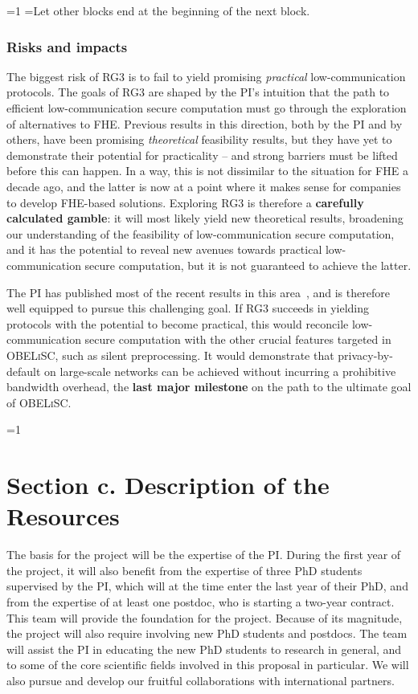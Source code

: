 \documentclass[oneside, a4paper, onecolumn, 11pt]{article}
\newcommand{\OBELiSC}{\textsc{OBELiSC}\xspace}
\newcounter{alphasect}
\def\alphainsection{0}
\let\oldsection=\section
\def\section{%
  \ifnum\alphainsection=1%
    \addtocounter{alphasect}{1}
  \fi%
\oldsection}%
\newenvironment{alphasection}{%
  \ifnum\alphainsection=1%
    \errhelp={Let other blocks end at the beginning of the next block.}
    \errmessage{Nested Alpha section not allowed}
  \fi%
  \setcounter{alphasect}{0}
  \def\alphainsection{1}
}{%
  \setcounter{alphasect}{0}
  \def\alphainsection{0}
}%
\begin{document}
\begin{alphasection}
\subsubsection{Risks and impacts}

The biggest risk of RG3 is to fail to yield promising \emph{practical} low-communication protocols. The goals of RG3 are shaped by the PI's intuition that the path to efficient low-communication secure computation must go through the exploration of alternatives to FHE. Previous results in this direction, both by the PI and by others, have been promising \emph{theoretical} feasibility results, but they have yet to demonstrate their potential for practicality -- and strong barriers must be lifted before this can happen. In a way, this is not dissimilar to the situation for FHE a decade ago, and the latter is now at a point where it makes sense for companies to develop FHE-based solutions. Exploring RG3 is therefore a \textbf{carefully calculated gamble}: it will most likely yield new theoretical results, broadening our understanding of the feasibility of low-communication secure computation, and it has the potential to reveal new avenues towards practical low-communication secure computation, but it is not guaranteed to achieve the latter.

The PI has published most of the recent results in this area~\cite{EC:Couteau19,EC:CouMey21,TCC:BoyCouMey22}, and is therefore well equipped to pursue this challenging goal. If RG3 succeeds in yielding protocols with the potential to become practical, this would reconcile low-communication secure computation with the other crucial features targeted in \OBELiSC, such as silent preprocessing. It would demonstrate that privacy-by-default on large-scale networks can be achieved without incurring a prohibitive bandwidth overhead, the \textbf{last major milestone} on the path to the ultimate goal of \OBELiSC.

\iffalse
\section*{Section c. Description of the Resources}
\setcounter{subsection}{0}

The basis for the project will be the expertise of the PI. During the first year of the project, it will also benefit from the expertise of three PhD students supervised by the PI, which will at the time enter the last year of their PhD, and from the expertise of at least one postdoc, who is starting a two-year contract. This team will provide the foundation for the project. Because of its magnitude, the project will also require involving new PhD students and postdocs. The team will assist the PI in educating the new PhD students to research in general, and to some of the core scientific fields involved in this proposal in particular. We will also pursue and develop our fruitful collaborations with international partners.


\end{alphasection}
\end{document}
